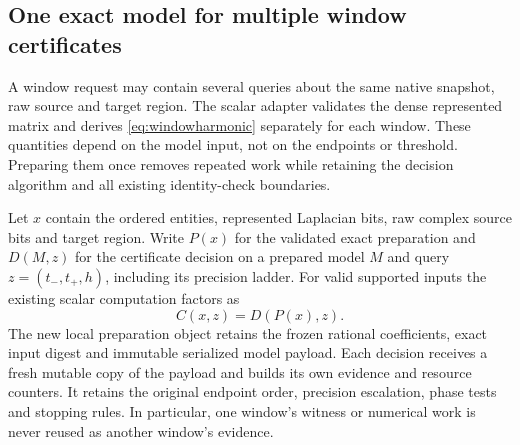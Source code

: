 \documentclass[11pt,a4paper]{article}
\theoremstyle{definition}\newtheorem{definition}[theorem]{Definition}
\begin{document}
\subsection{One exact model for multiple window certificates}\label{sec:batchreachability}
A window request may contain several queries about the same native snapshot, raw source and target region. The scalar adapter validates the dense represented matrix and derives \eqref{eq:windowharmonic} separately for each window. These quantities depend on the model input, not on the endpoints or threshold. Preparing them once removes repeated work while retaining the decision algorithm and all existing identity-check boundaries.

Let $x$ contain the ordered entities, represented Laplacian bits, raw complex source bits and target region. Write $P(x)$ for the validated exact preparation and $D(M,z)$ for the certificate decision on a prepared model $M$ and query $z=(t_-,t_+,h)$, including its precision ladder. For valid supported inputs the existing scalar computation factors as
\begin{equation}\label{eq:batchfactorization}
 C(x,z)=D(P(x),z).
\end{equation}
The new local preparation object retains the frozen rational coefficients, exact input digest and immutable serialized model payload. Each decision receives a fresh mutable copy of the payload and builds its own evidence and resource counters. It retains the original endpoint order, precision escalation, phase tests and stopping rules. In particular, one window's witness or numerical work is never reused as another window's evidence.
\end{document}
